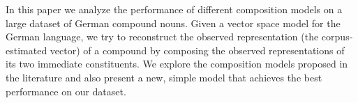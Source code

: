 In this paper we analyze the performance of different composition models on a large dataset of German compound nouns. Given a vector space model for the German language, we try to reconstruct the observed representation (the corpus-estimated vector) of a compound by composing the observed representations of its two immediate constituents. We explore the composition models proposed in the literature and also present a new, simple model that achieves the best performance on our dataset.
